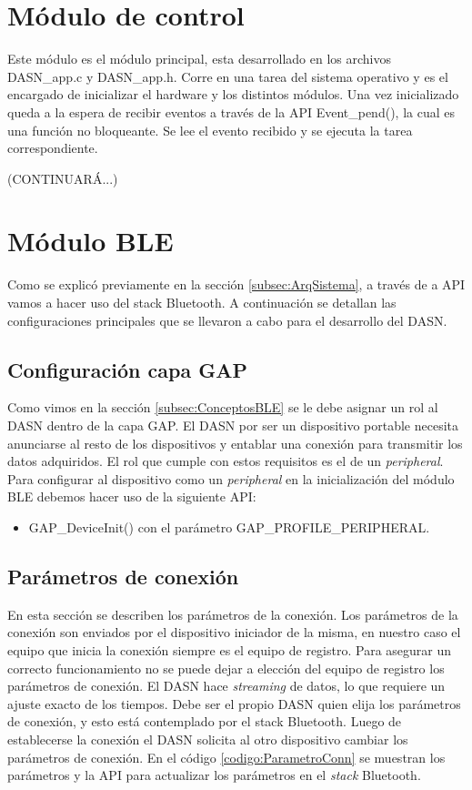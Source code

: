 
\newpage
\section{Módulo de control}
Este módulo es el módulo principal, esta desarrollado en los archivos DASN\_app.c y DASN\_app.h. Corre en una tarea del sistema operativo y es el encargado de inicializar el hardware y los distintos módulos. Una vez inicializado queda a la espera de recibir eventos a través de la API Event\_pend(), la cual es una función no bloqueante. Se lee el evento recibido y se ejecuta la tarea correspondiente. 

(CONTINUARÁ...)

\section{Módulo BLE}
Como se explicó previamente en la sección \ref{subsec:ArqSistema}, a través de a API vamos a hacer uso del stack Bluetooth. A continuación se detallan las configuraciones principales que se llevaron a cabo para el desarrollo del DASN. 

\subsection{Configuración capa GAP}
Como vimos en la sección \ref{subsec:ConceptosBLE} se le debe asignar un rol al DASN dentro de la capa GAP. El DASN por ser un dispositivo portable necesita anunciarse al resto de los dispositivos y entablar una conexión para transmitir los datos adquiridos. El rol que cumple con estos requisitos es el de un \textit{peripheral}. Para configurar al dispositivo como un \textit{peripheral} en la inicialización del módulo BLE debemos hacer uso de la siguiente API:
\begin{itemize}
\item GAP\_DeviceInit() con el parámetro GAP\_PROFILE\_PERIPHERAL.
\end{itemize}

\subsection{Parámetros de conexión}
En esta sección se describen los parámetros de la conexión. Los parámetros de la conexión son enviados por el dispositivo iniciador de la misma, en nuestro caso el equipo que inicia la conexión siempre es el equipo de registro. Para asegurar un correcto funcionamiento no se puede dejar a elección del equipo de registro los parámetros de conexión. El DASN hace \textit{streaming} de datos, lo que requiere un ajuste exacto de los tiempos. Debe ser el propio DASN quien elija los parámetros de conexión, y esto está contemplado por el stack Bluetooth. Luego de establecerse la conexión el DASN solicita al otro dispositivo cambiar los parámetros de conexión. En el código \ref{codigo:ParametroConn} se muestran los parámetros y la API para actualizar los parámetros en el \textit{stack} Bluetooth.


